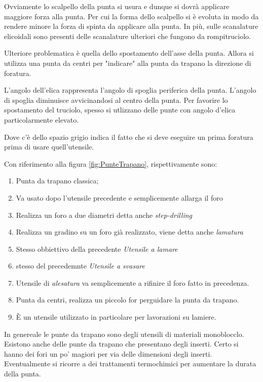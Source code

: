 Ovviamente lo scalpello della punta si usura e dunque si dovrà applicare maggiore forza alla punta.
Per cui la forma dello scalpello si è evoluta in modo da rendere minore la forza di spinta da applicare alla 
punta. In più, sulle scanalature elicoidali sono presenti delle scanalature ulteriori che fungono da 
rompitruciolo.

Ulteriore problematica è quella dello spostamento dell'asse della punta. Allora si utilizza una punta
da centri per "indicare" alla punta da trapano la direzione di foratura.

L'angolo dell'elica rappresenta l'angolo di spoglia periferica della punta.
L'angolo di spoglia diminuisce avvicinandosi al centro della punta.
Per favorire lo spostamento del truciolo, spesso si utlizzano delle punte con angolo d'elica particolarmente 
elevato.

Dove c'è dello spazio grigio indica il fatto che si deve eseguire un prima foratura prima di usare 
quell'utensile.

Con riferimento alla figura \ref{fig:PunteTrapano}, rispettivamente sono:
\begin{enumerate}
\item Punta da trapano classica;
\item Va usato dopo l'utensile precedente e semplicemente allarga il foro
\item Realizza un foro a due diametri detta anche \emph{step-drilling}
\item Realizza un gradino su un foro già realizzato, viene detta anche \emph{lamatura}
\item Stesso obbiettivo della precedente \emph{Utensile a lamare}
\item stesso del precedemnte \emph{Utensile a svasare}
\item Utensile di \emph{alesatura} va semplicemente a rifinire il foro fatto in precedenza.
\item Punta da centri, realizza un piccolo for perguidare la punta da trapano.
\item È un utensile utilizzato in particolare per lavorazioni su lamiere.
\end{enumerate}

In genereale le punte da trapano sono degli utensili di materiali monoblocclo. Esistono anche delle punte
da trapano che presentano degli inserti. Certo si hanno dei fori un po' magiori per via delle dimensioni
degli inserti.
Eventualmente si ricorre a dei trattamenti termochimici per aumentare la durata della punta.

